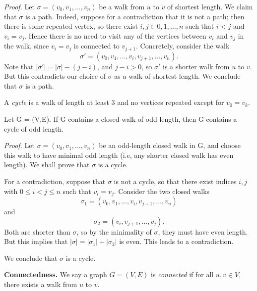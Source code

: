 \documentclass{tufte-handout}
\begin{document}

\textit{Proof.} Let \( \sigma = (v_0, v_1, \ldots, v_n) \) be a walk from \( u \) to \( v \) of shortest length.
We claim that \( \sigma \) is a path. Indeed, suppose for a contradiction that it is not a path; then there is some repeated vertex,
so there exist \( i,j \in {0,1,\ldots,n}\) such that \(i < j \) and \( v_i = v_j \).  Hence
there is no need to visit any of the vertices between \( v_i \) and \( v_j \) in the walk,
since \( v_i = v_j\) is connected to \( v_{j+1} \). Concretely, consider the walk 
\[\sigma'=(v_0, v_1, \ldots, v_i, v_{j+1}, \ldots, v_n).\]
Note that \( \left|\sigma'\right| = \left|\sigma\right| - (j-i) \), and \( j-i>0 \), so \( \sigma' \) is a
shorter walk from \( u \) to \( v \). But this contradicts our choice of \( \sigma \) as a walk of shortest length.
We conclude that \( \sigma \) is a path.
\qedsymbol

A \textit{cycle} is a walk of length at least 3 and no vertices repeated except for \( v_0 = v_k \).

\begin{Proposition}
    \label{prop:odd_cycle}
    Let G = (V,E). If G contains a closed walk of odd length, then G contains a cycle of odd length.
\end{Proposition}


\textit{Proof.} Let \( \sigma = (v_0, v_1, \ldots, v_n) \) be an odd-length closed walk
in G, and choose this walk to have minimal odd length (i.e, any shorter closed walk has even length).
We shall prove that \( \sigma \) is a cycle.

For a contradiction, suppose that \( \sigma \) is not a cycle, so that there exist indices \( i,j \) with \( 0 \leq i < j \leq n \)
such that \( v_i = v_j \). Consider the two closed walks
\[\sigma_1 = (v_0, v_1, \ldots, v_i, v_{j+1},\ldots , v_{n})\] and
\[\sigma_2 = (v_i, v_{j+1}, \ldots, v_j).\]
Both are shorter than \( \sigma \), so by the minimality of \( \sigma \), they must have even length.
But this implies that \( \left|\sigma\right| = \left|\sigma_1\right| + \left|\sigma_2\right| \) is even.
This leads to a contradiction.

We conclude that \( \sigma \) is a cycle. \qedsymbol

\textbf{Connectedness.} We say a graph \( G = (V,E) \) is \textit{connected} if for all \( u,v \in V \),
there exists a walk from \( u \) to \( v \).
\end{document}
